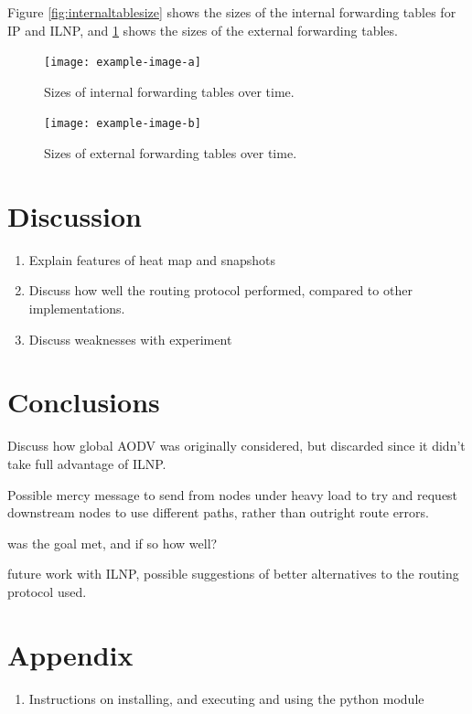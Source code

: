 \documentclass[12pt]{article}
\begin{document}
\FloatBarrier
Figure \ref{fig:internaltablesize} shows the sizes of the internal forwarding tables for IP and ILNP, and \ref{fig:externaltablesize} shows the sizes of the external forwarding tables.

\begin{figure}[!ht]
    \centering
    \begin{minipage}{0.45\textwidth}
        \centering
        \texttt{[image: example-image-a]} %
        \caption{Sizes of internal forwarding tables over time.}
        \label{fig:internaltablesize}
    \end{minipage}\hfill
    \begin{minipage}{0.45\textwidth}
        \centering
        \texttt{[image: example-image-b]} %
        \caption{Sizes of external forwarding tables over time.}
        \label{fig:externaltablesize}
    \end{minipage}\hfill
\end{figure}

\FloatBarrier

\section{Discussion}

\begin{enumerate}
\item Explain features of heat map and snapshots
\item Discuss how well the routing protocol performed, compared to other implementations. 
\item Discuss weaknesses with experiment
\end{enumerate}

\pagebreak
\section{Conclusions}

Discuss how global AODV was originally considered, but discarded since it didn't take full advantage of ILNP.

Possible mercy message to send from nodes under heavy load to try and request downstream nodes to use different paths, rather than outright route errors.

was the goal met, and if so how well?

future work with ILNP, possible suggestions of better alternatives to the routing protocol used.

\pagebreak
\section{Appendix}
\begin{enumerate}
\item Instructions on installing, and executing and using the python module
\end{enumerate}



\end{document}
